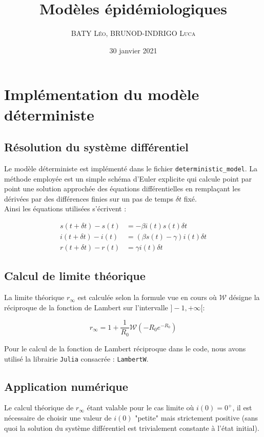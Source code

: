 \documentclass[12pt]{extarticle}
\title{Modèles épidémiologiques}
\date{30 janvier 2021}
\author{\textsc{BATY Léo}, \textsc{BRUNOD-INDRIGO Luca}}
\begin{document}
\maketitle

\section{Implémentation du modèle déterministe}

\subsection{Résolution du système différentiel}

Le modèle déterministe est implémenté dans le fichier \texttt{deterministic\_model}.
La méthode employée est un simple schéma d'Euler explicite qui calcule point par point une solution approchée des équations différentielles en remplaçant les dérivées par des différences finies sur un pas de temps $\delta t$ fixé.\\
Ainsi les équations utilisées s'écrivent : 

\begin{align*}
    s(t+\delta t) - s(t) &= -\beta i(t) s(t) \delta t\\
    i(t+\delta t) - i(t) &= (\beta s(t) - \gamma) i(t) \delta t\\
    r(t+\delta t) - r(t) &= \gamma i(t) \delta t
\end{align*}

\subsection{Calcul de limite théorique}

La limite théorique $r_\infty$ est calculée selon la formule vue en cours où $\mathcal{W}$ désigne la réciproque de la fonction de Lambert sur l'intervalle $]-1, +\infty[$: 

$$r_\infty = 1 + \frac{1}{R_0} \mathcal{W}(-R_0 e^{-R_0})$$

Pour le calcul de la fonction de Lambert réciproque dans le code, nous avons utilisé la librairie \texttt{Julia} consacrée : \texttt{LambertW}.

\subsection{Application numérique}

Le calcul théorique de $r_\infty$ étant valable pour le cas limite où $i(0) = 0^+$, il est nécessaire de choisir une valeur de $i(0)$ "petite" mais strictement positive (sans quoi la solution du système différentiel est trivialement constante à l'état initial).\\
\end{document}
